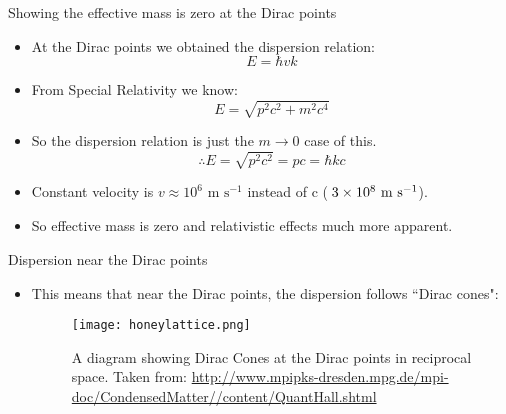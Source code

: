 \documentclass{beamer}
\begin{document}
\begin{frame}[t]{Showing the effective mass is zero at the Dirac points}
\begin{itemize}
\item At the Dirac points we obtained the dispersion relation:
\begin{equation}
E=\hbar v k
\end{equation}
\item From Special Relativity we know:
\begin{equation}
E=\sqrt{p^2c^2 + m^2c^4}
\end{equation}
\item So the dispersion relation is just the $m\rightarrow0$ case of this.
\begin{equation}
\therefore E=\sqrt{p^2c^2} = pc = \hbar k c
\end{equation}
\item Constant velocity is $v\approx 10^6 \text{ m s}^{-1}$  instead of c ($\urltilde 3\times 10^8 \text{ m s}^{-1}$).
\item So effective mass is zero and relativistic effects much more apparent.
\end{itemize}
\end{frame}

\begin{frame}[t]{Dispersion near the Dirac points}
\begin{itemize}
\item This means that near the Dirac points, the dispersion follows ``Dirac cones":
\begin{figure}[c]
\texttt{[image: honeylattice.png]}
\caption{A diagram showing Dirac Cones at the Dirac points in reciprocal space. Taken from:  \url{http://www.mpipks-dresden.mpg.de/mpi-doc/CondensedMatter//content/QuantHall.shtml}}
\end{figure}
\end{itemize}


\end{frame}
\end{document}
